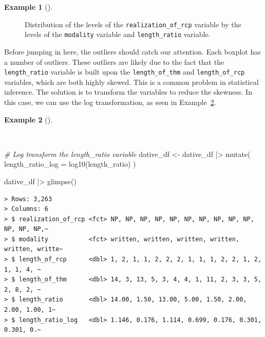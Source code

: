 \documentclass[
  letterpaper,
  DIV=11,
  numbers=noendperiod]{scrreprt}
\newenvironment{Shaded}{\begin{snugshade}}{\end{snugshade}}
\newcommand{\AttributeTok}[1]{\textcolor[rgb]{0.00,0.00,0.00}{#1}}
\newcommand{\CommentTok}[1]{\textcolor[rgb]{0.00,0.00,0.00}{\textit{#1}}}
\newcommand{\FunctionTok}[1]{\textcolor[rgb]{0.00,0.00,0.00}{#1}}
\newcommand{\NormalTok}[1]{\textcolor[rgb]{0.00,0.00,0.00}{#1}}
\newcommand{\OtherTok}[1]{\textcolor[rgb]{0.00,0.00,0.00}{#1}}
\newcommand{\SpecialCharTok}[1]{\textcolor[rgb]{0.00,0.00,0.00}{#1}}
\theoremstyle{definition}
\newtheorem{example}{Example}[chapter]
\theoremstyle{remark}
\begin{document}
\begin{example}[]
\begin{figure}[H]
\begin{minipage}{0.50\linewidth}


\end{minipage}%

\caption{\label{fig-ida-cat-bivariate-length-ratio}Distribution of the
levels of the \texttt{realization\_of\_rcp} variable by the levels of
the \texttt{modality} variable and \texttt{length\_ratio} variable.}

\end{figure}%

\end{example}

Before jumping in here, the outliers should catch our attention. Each
boxplot has a number of outliers. These outliers are likely due to the
fact that the \texttt{length\_ratio} variable is built upon the
\texttt{length\_of\_thm} and \texttt{length\_of\_rcp} variables, which
are both highly skewed. This is a common problem in statistical
inference. The solution is to transform the variables to reduce the
skewness. In this case, we can use the log transformation, as seen in
Example~\ref{exm-ida-cat-log-transform}.

\begin{example}[]\protect\hypertarget{exm-ida-cat-log-transform}{}\label{exm-ida-cat-log-transform}

~

\begin{Shaded}
\begin{Highlighting}[]
\CommentTok{\# Log transform the \textasciigrave{}length\_ratio\textasciigrave{} variable}
\NormalTok{dative\_df }\OtherTok{\textless{}{-}}
\NormalTok{  dative\_df }\SpecialCharTok{|\textgreater{}}
  \FunctionTok{mutate}\NormalTok{(}
    \AttributeTok{length\_ratio\_log =} \FunctionTok{log10}\NormalTok{(length\_ratio)}
\NormalTok{  )}

\NormalTok{dative\_df }\SpecialCharTok{|\textgreater{}} \FunctionTok{glimpse}\NormalTok{()}
\end{Highlighting}
\end{Shaded}

\begin{verbatim}
> Rows: 3,263
> Columns: 6
> $ realization_of_rcp <fct> NP, NP, NP, NP, NP, NP, NP, NP, NP, NP, NP, NP, NP,~
> $ modality           <fct> written, written, written, written, written, writte~
> $ length_of_rcp      <dbl> 1, 2, 1, 1, 2, 2, 2, 1, 1, 1, 2, 2, 1, 2, 1, 1, 4, ~
> $ length_of_thm      <dbl> 14, 3, 13, 5, 3, 4, 4, 1, 11, 2, 3, 3, 5, 2, 8, 2, ~
> $ length_ratio       <dbl> 14.00, 1.50, 13.00, 5.00, 1.50, 2.00, 2.00, 1.00, 1~
> $ length_ratio_log   <dbl> 1.146, 0.176, 1.114, 0.699, 0.176, 0.301, 0.301, 0.~
\end{verbatim}

\end{example}
\end{document}
